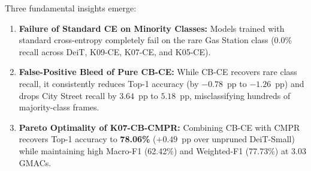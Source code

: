 \documentclass[conference]{IEEEtran}
\begin{document}
Three fundamental insights emerge:
\begin{enumerate}
    \item \textbf{Failure of Standard CE on Minority Classes:} Models trained with standard cross-entropy completely fail on the rare Gas Station class ($0.0\%$ recall across DeiT, K09-CE, K07-CE, and K05-CE).
    \item \textbf{False-Positive Bleed of Pure CB-CE:} While CB-CE recovers rare class recall, it consistently reduces Top-1 accuracy (by $-0.78$~pp to $-1.26$~pp) and drops City Street recall by $3.64$~pp to $5.18$~pp, misclassifying hundreds of majority-class frames.
    \item \textbf{Pareto Optimality of K07-CB-CMPR:} Combining CB-CE with CMPR recovers Top-1 accuracy to \textbf{78.06\%} ($+0.49$~pp over unpruned DeiT-Small) while maintaining high Macro-F1 (62.42\%) and Weighted-F1 (77.73\%) at 3.03 GMACs.
\end{enumerate}
\end{document}
